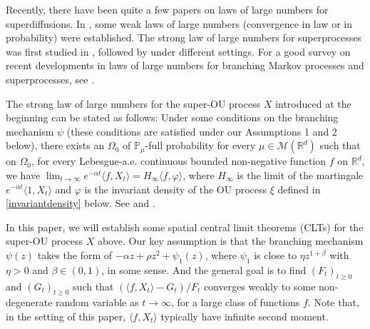 \documentclass[12pt,a4paper]{amsart}
\theoremstyle{plain}
\theoremstyle{definition}
\numberwithin{equation}{section}
\begin{document}
Recently, there have been quite a few papers on laws of large numbers for superdiffusions.
In \cite{Englander2009Law, EnglanderWinter2006Law, EnglanderTuraev2002A-scaling}, some weak laws of large numbers (convergence in law or in probability) were established.
The strong law of large numbers for superprocesses was first studied in \cite{ChenRenWang2008An-almost}, followed by \cite{ChenRenSongZhang2015Strong-law, ChenRenYang2019Skeleton, EckhoffKyprianouWinkel2015Spines, KouritzinRen2014A-strong, LiuRenSong2013Strong, Wang2010An-almost} under different settings.
For a good survey on recent developments in laws of large numbers for branching Markov processes and superprocesses, see \cite{EckhoffKyprianouWinkel2015Spines}.

The strong law of large numbers for the super-OU process $X$ introduced at the beginning can be stated as follows:
Under some conditions on the branching mechanism $\psi$ (these conditions are satisfied under our Assumptions 1 and 2 below), there exists an $\Omega_0$ of $\mathbb{P}_\mu$-full probability for every $\mu\in\mathcal M(\mathbb R^d)$ such that on $\Omega_0$, for every Lebesgue-a.\/e. continuous bounded non-negative function $f$ on $\mathbb R^d$, we have $\lim_{t\to\infty} e^{-\alpha t} \langle f, X_t\rangle =H_\infty\langle f, \varphi\rangle $, where $H_\infty$ is the limit of the martingale $e^{-\alpha t}\langle 1,X_t\rangle$ and $\varphi$ is the invariant density of the OU process $\xi$ defined in \eqref{invariantdensity} below.
See \cite[Theorem 2.13 \& Example 8.1]{ChenRenYang2019Skeleton} and \cite[Theorem 1.2 \& Example 4.1]{EckhoffKyprianouWinkel2015Spines}.

In this paper, we will establish some spatial central limit theorems (CLTs) for the super-OU process $X$ above.
Our key assumption is that the branching mechanism $\psi(z)$ takes the form of $-\alpha z +\rho z^2+ \psi_1(z)$, where $\psi_1$ is close to $\eta z^{1+\beta}$ with $\eta>0$ and $\beta\in (0, 1)$, in some sense.
And the general goal is to find $(F_t)_{t\geq 0}$ and $(G_t)_{t\geq 0}$ such that $ (\langle f, X_t \rangle -G_t)/F_t $ converges weakly to some non-degenerate random variable as $t\rightarrow\infty$, for a large class of functions $f$.
Note that, in the setting of this paper, $\langle f,X_t\rangle$ typically have infinite second moment.
\end{document}
